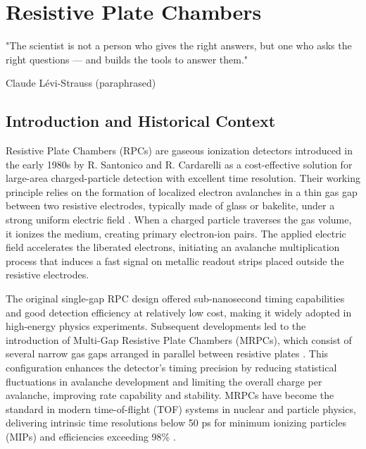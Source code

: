 
%

\chapter{Resistive Plate Chambers}
\label{cha:RPC}

\epigraph{
	"The scientist is not a person who gives the right answers, but one who asks the right questions — and builds the tools to answer them."
}{Claude Lévi-Strauss (paraphrased)}



\section{Introduction and Historical Context}

Resistive Plate Chambers (\gls{RPC}s) are gaseous ionization detectors introduced in the early 1980s by R. Santonico and R. Cardarelli \cite{santonico_development_1981} as a cost-effective solution for large-area charged-particle detection with excellent time resolution. Their working principle relies on the formation of localized electron avalanches in a thin gas gap between two resistive electrodes, typically made of glass or bakelite, under a strong uniform electric field \cite{riegler_physics_2004}. When a charged particle traverses the gas volume, it ionizes the medium, creating primary electron-ion pairs. The applied electric field accelerates the liberated electrons, initiating an avalanche multiplication process that induces a fast signal on metallic readout strips placed outside the resistive electrodes.

The original single-gap \gls{RPC} design offered sub-nanosecond timing capabilities and good detection efficiency at relatively low cost, making it widely adopted in high-energy physics experiments. Subsequent developments led to the introduction of Multi-Gap Resistive Plate Chambers (MRPCs), which consist of several narrow gas gaps arranged in parallel between resistive plates \cite{riegler_physics_2004}. This configuration enhances the detector’s timing precision by reducing statistical fluctuations in avalanche development and limiting the overall charge per avalanche, improving rate capability and stability. MRPCs have become the standard in modern time-of-flight (TOF) systems in nuclear and particle physics, delivering intrinsic time resolutions below 50 ps for minimum ionizing particles (MIPs) and efficiencies exceeding 98\% \cite{blanco_ship_2020}.

